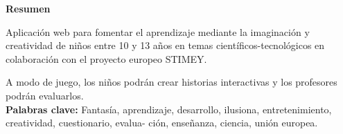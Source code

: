 \newpage{\pagestyle{empty}\cleardoublepage} 
\vspace*{\fill}
\begin{center}
	\textbf{Resumen}
\end{center}
Aplicación web para fomentar el aprendizaje mediante la imaginación y creatividad de niños entre 10 y 13 años en temas científicos-tecnológicos en colaboración con el proyecto europeo STIMEY.

A modo de juego, los niños podrán crear historias interactivas y los profesores podrán evaluarlos.\\

\textbf{Palabras clave:}
Fantasía, aprendizaje, desarrollo, ilusiona, entretenimiento, creatividad, cuestionario, evalua-
ción, enseñanza, ciencia, unión europea.
\vspace*{\fill}

\newpage
